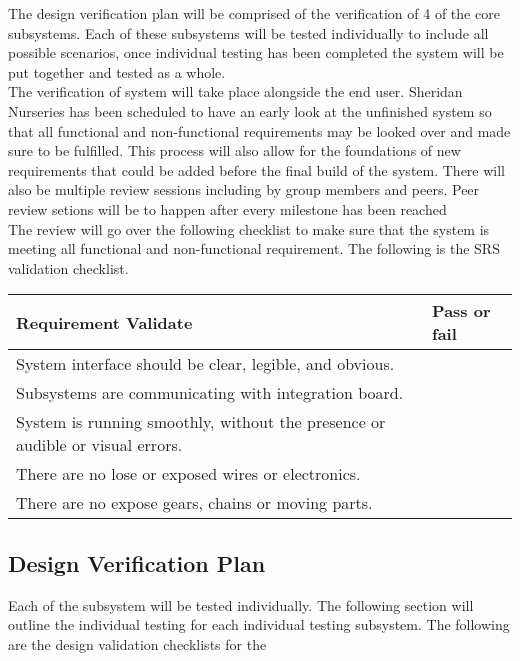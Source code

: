 \documentclass[12pt, titlepage]{article}
\begin{document}
The design verification plan will be comprised of the verification of 4 of the core subsystems.
 Each of these subsystems will be tested individually to include all possible scenarios, once 
 individual testing has been completed the system will be put together and tested as a whole.\\

The verification of system will take place alongside the end user. Sheridan Nurseries has been
 scheduled to have an early look at the unfinished system so that all functional and non-functional 
 requirements may be looked over and made sure to be fulfilled. This process will also allow for the 
 foundations of new requirements that could be added before the final build of the system. There will 
 also be multiple review sessions including by group members and peers. Peer review setions will be
 to happen after every milestone has been reached\\

The review will go over the following checklist to make sure that the system is meeting all functional 
and non-functional requirement. The following is the SRS validation checklist.

\begin{center}
  \begin{tabular}{ |m{10cm}|m{3cm}| } 
    \hline
    \textbf{Requirement Validate} & \textbf{Pass or fail } \\ 
    \hline
    System interface should be clear, legible, and obvious. & \\
    Subsystems are communicating with integration board.  & \\
    System is running smoothly, without the presence or audible or visual errors.& \\
    There are no lose or exposed wires or electronics.& \\
    There are no expose gears, chains or moving parts.& \\
    
    \hline
  \end{tabular}
\end{center}


\subsection{Design Verification Plan}
Each of the subsystem will be tested individually. The following section will outline the individual testing
 for each individual testing subsystem. The following are the design validation checklists for the 
\end{document}
